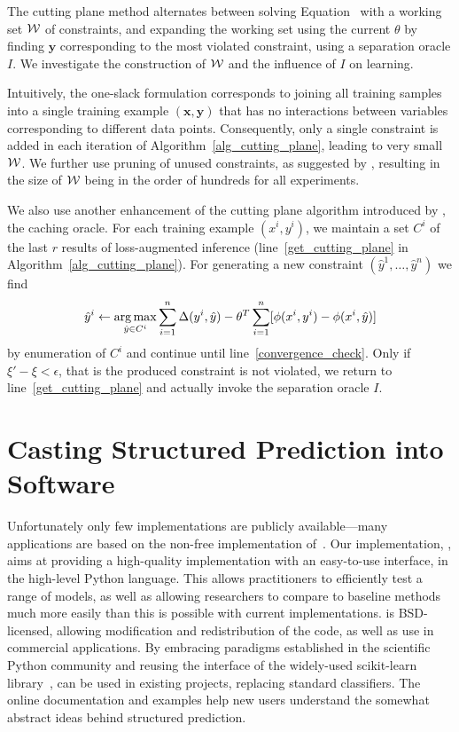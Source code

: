 The cutting plane method alternates between solving Equation~
with a working set $\mathcal{W}$ of constraints, and expanding the working set using the
current $\theta$ by finding $\mathbf{y}$ corresponding to the most violated constraint,
using a separation oracle $I$.
We investigate the construction of $\mathcal{W}$ and the influence of $I$
on learning.


Intuitively, the one-slack formulation corresponds to joining all training
samples into a single training example $(\mathbf{x}, \mathbf{y})$ that has no
interactions between variables corresponding to different data points.
Consequently, only a single constraint is added in each iteration of
Algorithm~\ref{alg_cutting_plane}, leading to very small $\mathcal{W}$. We further use
pruning of unused constraints, as suggested by \citet{joachims2009cutting},
resulting in the size of $\mathcal{W}$ being in the order of hundreds for all experiments.

We also use another enhancement of the cutting plane algorithm introduced by
\citet{joachims2009cutting}, the caching oracle. For each training example $(x^i, y^i)$,
we maintain a set $C^i$ of the last $r$ results of loss-augmented inference
(line~\ref{get_cutting_plane} in Algorithm~\ref{alg_cutting_plane}).
For generating a new constraint $(\hat{y}^1, \dotsc, \hat{y}^n)$ we find
\[ 
    \hat{y}^i \leftarrow \operatorname*{arg\,max}_{\hat{y}\in C^i} \sum_{i=1}^n \Delta(y^i, \hat{y}) - \theta^T \sum_{i=1}^n [\phi(x^i, y^i) - \phi(x^i, \hat{y})]
\]
by enumeration of $C^i$ and continue until line~\ref{convergence_check}.
Only if $\xi' - \xi < \epsilon$, that is the produced constraint is not violated, we
return to line~\ref{get_cutting_plane} and actually invoke the separation
oracle $I$.


\section{Casting Structured Prediction into Software}\label{sec:api}
Unfortunately only few implementations are publicly
available---many applications are based on the non-free implementation
of~\citet{joachims2009cutting}.
Our implementation, \pystruct, aims at providing a high-quality implementation
with an easy-to-use interface, in the high-level Python language.  This allows
practitioners to efficiently test a range of models, as well as allowing
researchers to compare to baseline methods much more easily than this is
possible with current implementations.  \pystruct is BSD-licensed, allowing
modification and redistribution of the code, as well as use in commercial
applications.  By embracing paradigms established in the scientific Python
community and reusing the interface of the widely-used {\sc scikit-learn}
library~\citep{pedregosa2011scikit}, \pystruct can be used in existing
projects, replacing standard classifiers.  The online documentation and
examples help new users understand the somewhat abstract ideas behind
structured prediction.

